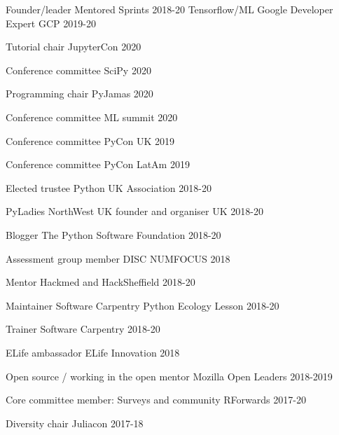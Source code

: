 


\begin{cvpress}

\cvpres
{Founder/leader}
{Mentored Sprints}
{2018-20}
\cvpres
{Tensorflow/ML Google Developer Expert}
{GCP}
{2019-20}

\cvpres
{Tutorial chair}
{JupyterCon}
{2020}

\cvpres
{Conference committee}
{SciPy}
{2020}

\cvpres
{Programming chair}
{PyJamas}
{2020}

\cvpres
{Conference committee}
{ML summit}
{2020}

\cvpres
{Conference committee}
{PyCon UK}
{2019}

\cvpres
{Conference committee}
{PyCon LatAm}
{2019}

\cvpres
{Elected trustee} %
{Python UK Association}
{2018-20}

\cvpres
{PyLadies NorthWest UK founder and organiser} %
{UK}
{2018-20}

\cvpres
{Blogger} %
{The Python Software Foundation}
{2018-20}


\cvpres
{Assessment group member}
{DISC NUMFOCUS}
{2018}

\cvpres
{Mentor}
{Hackmed and HackSheffield}
{2018-20}

\cvpres
{Maintainer} %
{Software Carpentry Python Ecology Lesson}
{2018-20}

\cvpres
{Trainer} %
{Software Carpentry}
{2018-20}

\cvpres
{ELife ambassador}
{ELife Innovation}
{2018}

\cvpres
{Open source / working in the open mentor} %
{Mozilla Open Leaders} %
{2018-2019} %

\cvpres
{Core committee member: Surveys and community} %
{RForwards}
{2017-20} %

\cvpres
{Diversity chair} %
{Juliacon} %
{2017-18} %


\end{cvpress}
